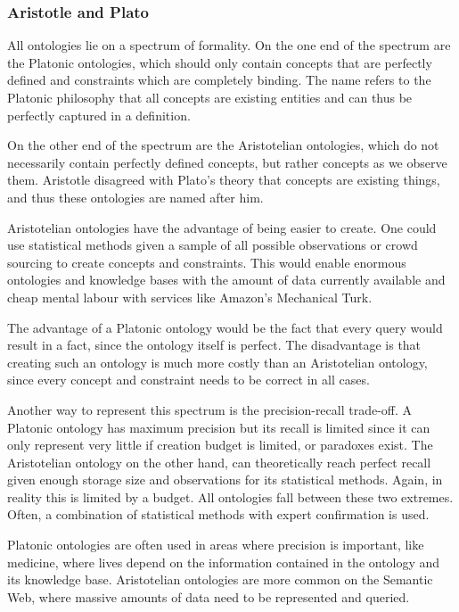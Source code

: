 \documentclass{article}
\begin{document}
 \subsubsection{Aristotle and Plato}
 All ontologies lie on a spectrum of formality. On the one end of the spectrum are the Platonic ontologies, which should only contain concepts that are perfectly defined and constraints which are completely binding. The name refers to the Platonic philosophy that all concepts are existing entities and can thus be perfectly captured in a definition.
 
 On the other end of the spectrum are the Aristotelian ontologies, which do not necessarily contain perfectly defined concepts, but rather concepts as we observe them. Aristotle disagreed with Plato's theory that concepts are existing things, and thus these ontologies are named after him\cite{aristotleplato}.
 
 Aristotelian ontologies have the advantage of being easier to create. One could use statistical methods given a sample of all possible observations or crowd sourcing to create concepts and constraints. This would enable enormous ontologies and knowledge bases with the amount of data currently available and cheap mental labour with services like Amazon's Mechanical Turk.
 
 The advantage of a Platonic ontology would be the fact that every query would result in a fact, since the ontology itself is perfect. The disadvantage is that creating such an ontology is much more costly than an Aristotelian ontology, since every concept and constraint needs to be correct in all cases.
 
 Another way to represent this spectrum is the precision-recall trade-off. A Platonic ontology has maximum precision but its recall is limited since it can only represent very little if creation budget is limited, or paradoxes exist. The Aristotelian ontology on the other hand, can theoretically reach perfect recall given enough storage size and observations for its statistical methods. Again, in reality this is limited by a budget. All ontologies fall between these two extremes. Often, a combination of statistical methods with expert confirmation is used.
 
 Platonic ontologies are often used in areas where precision is important, like medicine, where lives depend on the information contained in the ontology and its knowledge base. Aristotelian ontologies are more common on the Semantic Web, where massive amounts of data need to be represented and queried.
 
\end{document}
